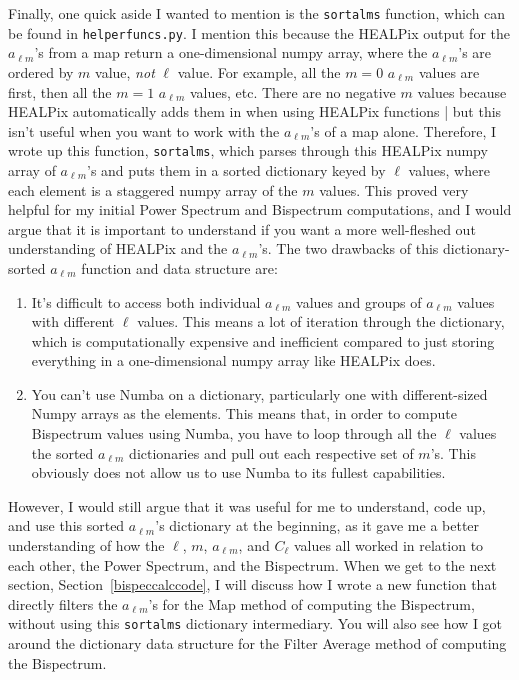 \documentclass[11pt]{article}
\renewcommand{\_}[1]{\underline{ #1 }}
\newcommand{\npar}{\vspace{.3cm}\newline}
\newcommand{\us}{\textunderscore}
\begin{document}
{\npar
Finally, one quick aside I wanted to mention is the \texttt{sort\us alms} function, which can be found in \texttt{helper\us funcs.py}. I mention this because the HEALPix output for the $a_{\ell m}$'s from a map return a one-dimensional numpy array, where the $a_{\ell m}$'s are ordered by $m$ value, \textit{not} $\ell$ value. For example, all the $m = 0$ $a_{\ell m}$ values are first, then all the $m = 1$ $a_{\ell m}$ values, etc. There are no negative $m$ values because HEALPix automatically adds them in when using HEALPix functions | but this isn't useful when you want to work with the $a_{\ell m}$'s of a map alone. Therefore, I wrote up this function, \texttt{sort\us alms}, which parses through this HEALPix numpy array of $a_{\ell m}$'s and puts them in a sorted dictionary keyed by $\ell$ values, where each element is a staggered numpy array of the $m$ values. This proved very helpful for my initial Power Spectrum and Bispectrum computations, and I would argue that it is important to understand if you want a more well-fleshed out understanding of HEALPix and the $a_{\ell m}$'s. The two drawbacks of this dictionary-sorted $a_{\ell m}$ function and data structure are:
\begin{enumerate}
    \item It's difficult to access both individual $a_{\ell m}$ values and groups of $a_{\ell m}$ values with different $\ell$ values. This means a lot of iteration through the dictionary, which is computationally expensive and inefficient compared to just storing everything in a one-dimensional numpy array like HEALPix does.
    \item You can't use Numba on a dictionary, particularly one with different-sized Numpy arrays as the elements. This means that, in order to compute Bispectrum values using Numba, you have to loop through all the $\ell$ values the sorted $a_{\ell m}$ dictionaries and pull out each respective set of $m$'s. This obviously does not allow us to use Numba to its fullest capabilities.
\end{enumerate}

However, I would still argue that it was useful for me to understand, code up, and use this sorted $a_{\ell m}$'s dictionary at the beginning, as it gave me a better understanding of how the $\ell$, $m$, $a_{\ell m}$, and $C_{\ell}$ values all worked in relation to each other, the Power Spectrum, and the Bispectrum. When we get to the next section, Section~\ref{bispeccalccode}, I will discuss how I wrote a new function that directly filters the $a_{\ell m}$'s for the Map method of computing the Bispectrum, without using this \texttt{sort\us alms} dictionary intermediary. You will also see how I got around the dictionary data structure for the Filter Average method of computing the Bispectrum.

}
\end{document}

